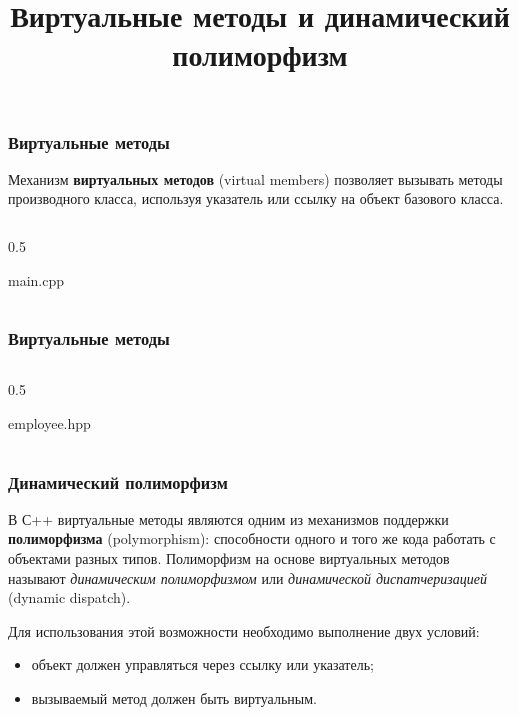 \documentclass[compress, 8pt, aspectratio=169]{beamer}
\title{Виртуальные методы и динамический полиморфизм}
\begin{document}
\frame[plain]{\titlepage}

\begin{frame}[fragile]

    \frametitle{Виртуальные методы}

    \hfill\break
    Механизм \textbf{виртуальных методов} (virtual members) позволяет вызывать
    методы производного класса, используя указатель или ссылку на объект
    базового класса.

    \begin{columns}

        \begin{column}{0.5\textwidth}

                {main.cpp}

        \end{column}

    \end{columns}

\end{frame}

\begin{frame}[fragile]

    \frametitle{Виртуальные методы}

    \begin{columns}

        \begin{column}{0.5\textwidth}

                {employee.hpp}

        \end{column}

    \end{columns}

\end{frame}

\begin{frame}[fragile]

    \frametitle{Динамический полиморфизм}

    В С++ виртуальные методы являются одним из механизмов поддержки
    \textbf{полиморфизма} (polymorphism): способности одного и того же
    кода работать с объектами разных типов.
    Полиморфизм на основе виртуальных методов называют \textit{динамическим
    полиморфизмом} или \textit{динамической диспатчеризацией} (dynamic dispatch).

    \hfill\break
    Для использования этой возможности необходимо выполнение двух условий:

    \begin{itemize}
        \item объект должен управляться через ссылку или указатель;
        \item вызываемый метод должен быть виртуальным.
    \end{itemize}

\end{frame}
\end{document}
